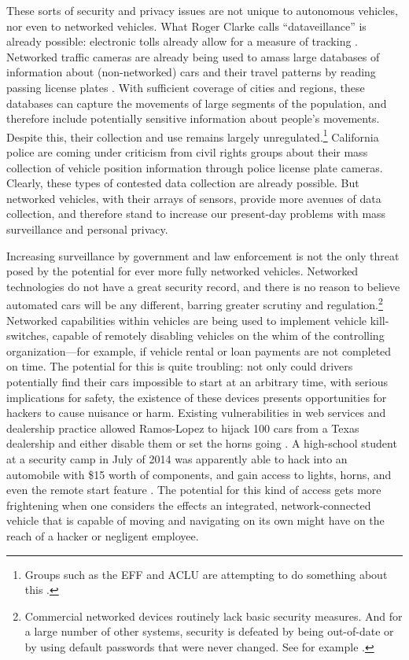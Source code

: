 
These sorts of security and privacy issues are not unique to
autonomous vehicles, nor even to networked vehicles. What Roger Clarke
calls ``dataveillance'' is already possible: electronic tolls already
allow for a measure of tracking \cite[p. 25]{nissenbaum}. Networked traffic cameras are
already being used to amass large databases of information about
(non-networked) cars and their travel patterns by reading passing
license plates \cite[p. 26]{nissenbaum}. With sufficient coverage of cities and regions,
these databases can capture the movements of large segments of the
population, and therefore include potentially sensitive information
about people's movements. Despite this, their collection and use
remains largely unregulated.\footnote{Groups such as the EFF and ACLU
  are attempting to do something about this \cite{kayyaliEFF}.} California police are coming under
criticism from civil rights groups about their mass collection of
vehicle position information through police license plate cameras.\cite{???}
Clearly, these types of contested data collection are already
possible. But networked vehicles, with their arrays of sensors,
provide more avenues of data collection, and therefore stand to
increase our present-day problems with mass surveillance and personal
privacy.

Increasing surveillance by government and law enforcement is not the
only threat posed by the potential for ever more fully networked
vehicles. Networked technologies do not have a great security record,
and there is no reason to believe automated cars will be any
different, barring greater scrutiny and
regulation.\footnote{Commercial networked devices routinely lack basic
security measures. And for a large number of other systems, security
is defeated by being out-of-date or by using default passwords that
were never changed. See for example \cite{zetter}.}
Networked capabilities within vehicles are being used to
implement vehicle kill-switches, capable of remotely disabling
vehicles on the whim of the controlling organization---for example, if
vehicle rental or loan payments are not completed on time. The
potential for this is quite troubling: not only could drivers
potentially find their cars impossible to start at an arbitrary time,
with serious implications for safety, the existence of these devices
presents opportunities for hackers to cause nuisance or
harm.\cite{goodman}
Existing vulnerabilities in web services and dealership practice
allowed Ramos-Lopez to hijack 100 cars from a Texas dealership and
either disable them or set
the horns
going \cite{poulsenHacker}. A
high-school student at a security camp in July of 2014 was apparently
able to hack into an automobile with \$15 worth of components, and
gain access to lights, horns, and even the remote start
feature \cite{bigelow14}.
The
potential for this kind of access gets more frightening when one
considers the effects an integrated, network-connected vehicle that is capable of
moving and navigating on its own might have on the reach of a hacker or negligent employee.

